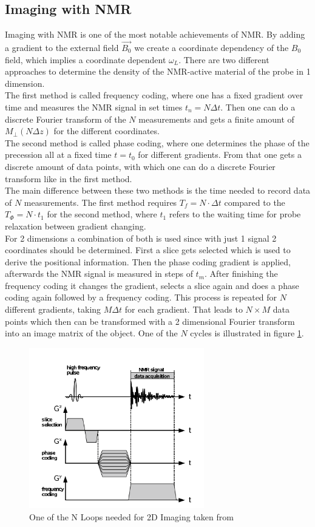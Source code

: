 \subsection{Imaging with NMR}\label{imagening}
Imaging with NMR is one of the most notable achievements of NMR. By adding a gradient to the external field $\vec{B_0}$ we create a coordinate dependency of the $B_0$ field, which implies a coordinate dependent $\omega_L$. There are two different approaches to determine the density of the NMR-active material of the probe in 1 dimension.
\vspace{2mm}\\
The first method is called frequency coding, where one has a fixed gradient over time and measures the NMR signal in set times $t_n = N \Delta t$. Then one can do a discrete Fourier transform of the $N$ measurements and gets a finite amount of $M_{\perp}(N \Delta z)$ for the different coordinates. 
\vspace{2mm}\\
The second method is called phase coding, where one determines the phase of the precession all at a fixed time $t = t_0$ for different gradients. From that one gets a discrete amount of data points, with which one can do a discrete Fourier transform like in the first method. 
\vspace{2mm}\\
The main difference between these two methods is the time needed to record data of $N$ measurements. The first method requires $T_f = N \cdot \Delta t$ compared to the $T_{\Phi} = N\cdot t_1$ for the second method, where $t_1$ refers to the waiting time for probe relaxation between gradient changing.
\vspace{3mm}\\
For 2 dimensions a combination of both is used since with just 1 signal 2 coordinates should be determined. First a slice gets selected which is used to derive the positional information.  Then the phase coding gradient is applied, afterwards the NMR signal is measured in steps of $t_m$. After finishing the frequency coding it changes the gradient, selects a slice again and does a phase coding again followed by a frequency coding. This process is repeated for $N$ different gradients, taking $M \Delta t$ for each gradient. That leads to $N \times M$ data points which then can be transformed with a 2 dimensional Fourier transform into an image matrix of the object. One of the $N$ cycles is illustrated in figure \ref{2dfourier}.\\
\begin{figure}[h]
	\centering
	\includegraphics[width=0.63\linewidth ,height=7cm]{images/2d_fourier.png}
	\caption{One of the N Loops needed for 2D Imaging taken from \cite{manual}}
	\label{2dfourier}
\end{figure}